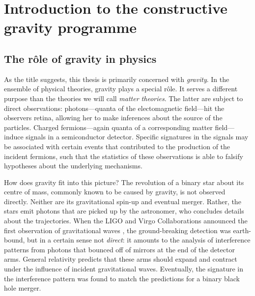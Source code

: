 \chapter{Introduction to the constructive gravity programme}\label{chapter_introduction}

\section{The r\^ole of gravity in physics}
As the title suggests, this thesis is primarily concerned with \emph{gravity}. In the ensemble of physical theories, gravity plays a special r\^ole. It serves a different purpose than the theories we will call \emph{matter theories}. The latter are subject to direct observations: photons---quanta of the electomagnetic field---hit the observers retina, allowing her to make inferences about the source of the particles. Charged fermions---again quanta of a corresponding matter field---induce signals in a semiconductor detector. Specific signatures in the signals may be associated with certain events that contributed to the production of the incident fermions, such that the statistics of these observations is able to falsify hypotheses about the underlying mechanisms.

How does gravity fit into this picture? The revolution of a binary star about its centre of mass, commonly known to be caused by gravity, is not observed directly. Neither are its gravitational spin-up and eventual merger. Rather, the stars emit photons that are picked up by the astronomer, who concludes details about the trajectories. When the LIGO and Virgo Collaborations announced the first observation of gravitational waves \cite{Abbott_2016}, the ground-breaking detection was earth-bound, but in a certain sense not \emph{direct}: it amounts to the analysis of interference patterns from photons that bounced off of mirrors at the end of the detector arms. General relativity predicts that these arms should expand and contract under the influence of incident gravitational waves. Eventually, the signature in the interference pattern was found to match the predictions for a binary black hole merger.

